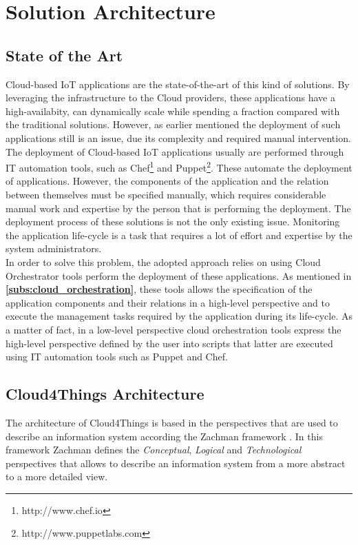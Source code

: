 \section{Solution Architecture}
\label{sec:solution_architecture}
\subsection{State of the Art}
\label{sub:state_of_art}
Cloud-based IoT applications are the state-of-the-art of this kind of solutions. By leveraging
the infrastructure to the Cloud providers, these applications have a high-availabity, can dynamically
scale while spending a fraction compared with the traditional solutions. However, as earlier
mentioned the deployment of such applications still is an issue, due its complexity and
required manual intervention. The deployment of Cloud-based IoT applications usually are performed
through IT automation tools, such as Chef\footnote{http://www.chef.io} and Puppet\footnote{http://www.puppetlabs.com}.
These automate the deployment of applications. However, the components of the application and the relation between
themselves must be specified manually, which requires considerable manual work and expertise by the person that
is performing the deployment. The deployment process of these solutions is not the only existing issue.
Monitoring the application life-cycle is a task that requires a lot of effort and expertise by the system
administrators.\\

In order to solve this problem, the adopted approach relies on using Cloud Orchestrator tools perform the
deployment of these applications. As mentioned in \textbf{\ref{subs:cloud_orchestration}},
these tools allows the specification of the application components and their relations in a high-level perspective
and to execute the management tasks required by the application during its life-cycle. As a matter of fact,
in a low-level perspective cloud orchestration tools express the high-level perspective defined by the user
into scripts that latter are executed using IT automation tools such as Puppet and Chef.
\subsection{Cloud4Things Architecture}
\label{sub:cloud4things_architecture}
The architecture of Cloud4Things is based in the perspectives that are
used to describe an information system according the Zachman framework \cite{}.
In this framework Zachman defines the \textit{Conceptual}, \textit{Logical} and
\textit{Technological} perspectives that allows to describe an information system
from a more abstract to a more detailed view.
